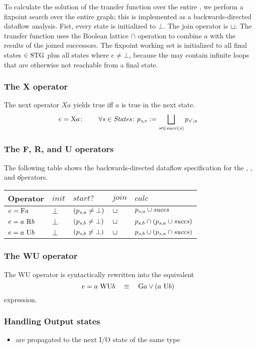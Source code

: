 To calculate the solution of the transfer function over the entire
\STG, we perform a fixpoint search over the entire graph; this is
implemented as a backwards-directed dataflow analysis. Fist,
every state is initialized to $\bot$. The join operator is $\sqcup$. The
transfer function uses the Boolean lattice $\cap$ operation to combine
$a$ with the results of the joined successors. The fixpoint working
set is initialized to all final states $\in\mathrm{STG}$ plus all states where
$e\neq\bot$, because the \STG may contain infinite loops that are
otherwise not reachable from a final state. 	

\subsubsection{The X operator}
The next operator $X a$ yields true iff $a$ is true in the next state.
\[ e = \mathrm{X} a\colon\qquad\forall\mathit{s}\in\mathit{States}\colon p_{\mathit{s},e}
:=\bigsqcup_{\mathit{s}\prime\in succ(\mathit{s})}{p_{\mathit{s}',a}} \]

\subsubsection{The F, R, and U operators}
The following table shows the backwards-directed dataflow
specification for the \F, \R, and \U operators.

\begin{tabular}{lllll}
\toprule
Operator & $\mathit{init}$ & $\mathit{start?}$ & $\mathit{join}$ & $\mathit{calc}$ \\\midrule

$e = \mathrm{F} a$    & $\bot$ & $(p_{\mathit{s},a}\neq\bot)$ & $\sqcup$ & $p_{\mathit{s},a}\cup\mathit{succs}$ \\
$e = a\ \mathrm{R} b$ & $\bot$ & $(p_{\mathit{s},b}\neq\bot)$ & $\sqcup$ & $p_{\mathit{s},b}\cap(p_{\mathit{s},a}\cup\mathit{succs})$\\
$e = a\ \mathrm{U} b$ & $\bot$ & $(p_{\mathit{s},b}\neq\bot)$ & $\sqcup$ & $p_{\mathit{s},b}\cup(p_{\mathit{s},a}\cap\mathit{succs})$\\
\bottomrule
\end{tabular}

\subsubsection{The WU operator}
The WU operator is syntactically rewritten into the equivalent
\[ e = a\ \mathrm{WU} b\quad\equiv\quad \mathrm{G} a \vee (a\ \mathrm{U} b) \]
expression.

\subsubsection{Handling Output states}
\begin{itemize}
\item are propagated to the next I/O state of the same type
\end{itemize}

